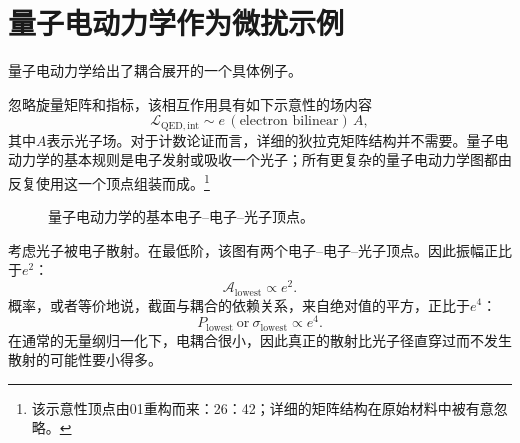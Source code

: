 \section{量子电动力学作为微扰示例}

量子电动力学给出了耦合展开的一个具体例子。

\begin{classroomqa}
\end{classroomqa}

忽略旋量矩阵和指标，该相互作用具有如下示意性的场内容
\begin{equation}
\mathcal{L}_{\mathrm{QED,int}}
\sim e\,(\text{electron bilinear})\,A,
\end{equation}
其中\(A\)表示光子场。对于计数论证而言，详细的狄拉克矩阵结构并不需要。量子电动力学的基本规则是电子发射或吸收一个光子；所有更复杂的量子电动力学图都由反复使用这一个顶点组装而成。\footnote{该示意性顶点由01重构而来：26：42；详细的矩阵结构在原始材料中被有意忽略。}

\begin{figure}[htbp]
\centering
{}
\caption{量子电动力学的基本电子--电子--光子顶点。}
\end{figure}

\begin{classroomqa}
\end{classroomqa}

\begin{classroomqa}
\end{classroomqa}

考虑光子被电子散射。在最低阶，该图有两个电子--电子--光子顶点。因此振幅正比于\(e^2\)：
\begin{equation}
\mathcal{A}_{\mathrm{lowest}}\propto e^2.
\end{equation}
概率，或者等价地说，截面与耦合的依赖关系，来自绝对值的平方，正比于\(e^4\)：
\begin{equation}
P_{\mathrm{lowest}}\ \text{or}\ \sigma_{\mathrm{lowest}}
\propto e^4.
\end{equation}
在通常的无量纲归一化下，电耦合很小，因此真正的散射比光子径直穿过而不发生散射的可能性要小得多。

